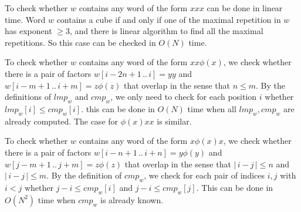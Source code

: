 \documentclass[12pt]{article}
\def\abs#1{{|\,#1\,|}}
\begin{document}
To check whether $w$ contains any word of the form $xxx$ can be done
in linear time. Word $w$ contains a cube if and only if one of the
maximal repetition in $w$ has exponent $\geq 3$, and there is linear
algorithm \cite{Kolpakov&Kucherov1999} to find all the maximal
repetitions. So this case can be checked in $O(N)$ time.


To check whether $w$ contains any word of the form $xx\phi(x)$, we
check whether there is a pair of factors $w[i-2n+1\,..\,i]=yy$ and
$w[i-m+1\,..\,i+m]=z\phi(z)$ that overlap in the sense that $n\leq
m$. By the definitions of $lmp_w$ and $cmp_w$, we only need to check
for each position $i$ whether $lmp_w[i]\leq cmp_w[i]$. this can be
done in $O(N)$ time when all $lmp_w,cmp_w$ are already computed. The
case for $\phi(x)xx$ is similar.


To check whether $w$ contains any word of the form $x\phi(x)x$, we
check whether there is a pair of factors
$w[i-n+1\,..\,i+n]=y\phi(y)$ and $w[j-m+1\,..\,j+m]=z\phi(z)$ that
overlap in the sense that $\abs{i-j}\leq n$ and $\abs{i-j}\leq m$.
By the definition of $cmp_w$, we check for each pair of indices
$i,j$ with $i<j$ whether $j-i\leq cmp_w[i]$ and $j-i\leq cmp_w[j]$.
This can be done in $O(N^2)$ time when $cmp_w$ is already known.
\end{document}
